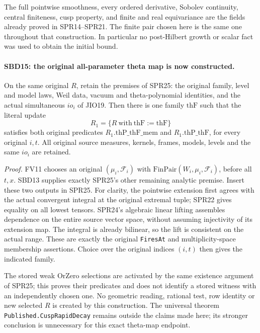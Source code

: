 \documentclass[11pt,a4paper]{article}
\numberwithin{equation}{section}
\theoremstyle{remark}\newtheorem{remark}[theorem]{Remark}
\begin{document}
The full pointwise smoothness, every ordered derivative,
Sobolev continuity, central finiteness, cusp property, and
finite and real equivariance are the fields already proved
in SPR14--SPR21.  The finite pair chosen here is the same
one throughout that construction.  In particular no
post-Hilbert growth or scalar fact was used to obtain the
initial bound.

\paragraph{SBD15: the original all-parameter theta map is now constructed.}
\label{claim:SBD15}
On the same original \(R\), retain the premises of SPR25:
the original family, level and model laws, Weil data,
vacuum and theta-polynomial identities, and the actual
simultaneous \(io_i\) of JIO19.  Then there is one family
\(\mathrm{thF}\) such that the literal update
\[
                  R_1=\{R\ \mathrm{with}\ \mathrm{thF}:=\mathrm{thF}\}
\]
satisfies both original predicates
\(R_1.\mathrm{thP\_thF\_mem}\) and
\(R_1.\mathrm{thP\_thF}\), for every original \(i,t\).
All original source measures, kernels, frames, models,
levels and the same \(io_i\) are retained.

\emph{Proof.}
FV11 chooses an original \((\mu_i,\mathcal F_i)\) with
\(\mathrm{FinPair}(W_i,\mu_i,\mathcal F_i)\), before all
\(t,x\).  SBD13 supplies exactly SPR25's other remaining
analytic premise.  Insert these two outputs in SPR25.
For clarity, the pointwise extension first agrees with the
actual convergent integral at the original extremal tuple;
SPR22 gives equality on all lowest tensors.  SPR24's
algebraic linear lifting assembles dependence on the entire
source vector space, without assuming injectivity of its
extension map.  The integral is already bilinear, so the
lift is consistent on the actual range.  These are exactly
the original \texttt{Fires\allowbreak At} and multiplicity-space
membership assertions.  Choice over the original indices
\((i,t)\) then gives the indicated family.

The stored weak \(\mathrm{OrZero}\) selections are activated
by the same existence argument of SPR25; this proves their
predicates and does not identify a stored witness with an
independently chosen one.  No geometric reading, rational
test, row identity or new selected \(R\) is created by this
construction.  The universal theorem
\texttt{Published.\allowbreak Cusp\allowbreak Rapid\allowbreak Decay} remains outside the
claims made here; its stronger conclusion is unnecessary
for this exact theta-map endpoint.
\end{document}
